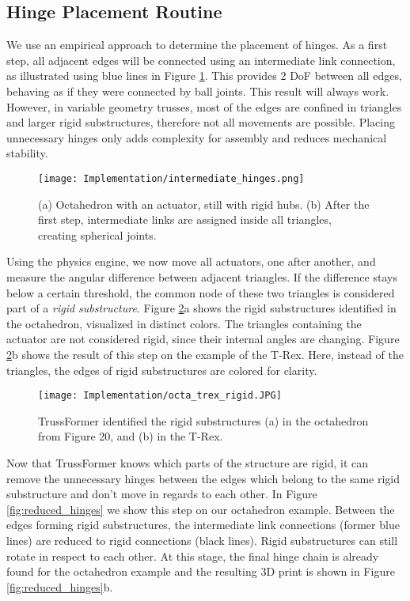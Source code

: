 \subsection{Hinge Placement Routine}\label{sec:hinge_placement_impl}
We use an empirical approach to determine the placement of hinges. As a first step, all adjacent edges will be connected using an intermediate link connection, as illustrated using blue lines in Figure \ref{fig:intermediate_hinges}. This provides 2 DoF between all edges, behaving as if they were connected by ball joints. This result will always work. However, in variable geometry trusses, most of the edges are confined in triangles and larger rigid substructures, therefore not all movements are possible. Placing unnecessary hinges only adds complexity for assembly and reduces mechanical stability.\\
\begin{figure}[h!]
    \texttt{[image: Implementation/intermediate\_hinges.png]}
    \centering
    \caption{(a) Octahedron with an actuator, still with rigid hubs. (b) After the first step, intermediate links are assigned inside all triangles, creating spherical joints.}
    \label{fig:intermediate_hinges}
\end{figure}
Using the physics engine, we now move all actuators, one after another, and measure the angular difference between adjacent triangles. If the difference stays below a certain threshold, the common node of these two triangles is considered part of a \textit{rigid substructure}. Figure \ref{fig:static_substructure}a shows the rigid substructures identified in the octahedron, visualized in distinct colors. The triangles containing the actuator are not considered rigid, since their internal angles are changing. Figure \ref{fig:static_substructure}b shows the result of this step on the example of the T-Rex. Here, instead of the triangles, the edges of rigid substructures are colored for clarity.\\
\begin{figure}[h!]
    \texttt{[image: Implementation/octa\_trex\_rigid.JPG]}
    \centering
    \caption{TrussFormer identified the rigid substructures (a) in the octahedron from Figure 20, and (b) in the T-Rex.}
    \label{fig:static_substructure}
\end{figure}
Now that TrussFormer knows which parts of the structure are rigid, it can remove the unnecessary hinges between the edges which belong to the same rigid substructure and don’t move in regards to each other. In Figure \ref{fig:reduced_hinges} we show this step on our octahedron example. Between the edges forming rigid substructures, the intermediate link connections (former blue lines) are reduced to rigid connections (black lines). Rigid substructures can still rotate in respect to each other. At this stage, the final hinge chain is already found for the octahedron example and the resulting 3D print is shown in Figure \ref{fig:reduced_hinges}b.
